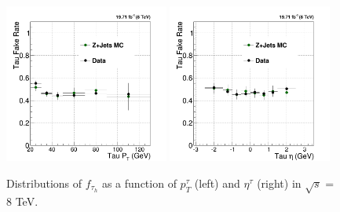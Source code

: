 \documentclass[oneside, letterpaper, oldfontcommands]{memoir}
\begin{document}
\begin{figure}[hbtp]\centering
\includegraphics[width=0.48\textwidth]{tightOldIso_looseOldIso_tPt_fakeRate_8TeV.png}
\includegraphics[width=0.48\textwidth]{tightOldIso_looseOldIso_tEta_fakeRate_8TeV.png}
\caption{Distributions of $f_{\tau_{h}}$ as a function of $ p_{T}^{\tau}$ (left) and $\eta^{\tau}$ (right) in $\sqrt{s}$ = 8 TeV.}
\label{fig:taufakerate8TeV}\end{figure}
\end{document}

